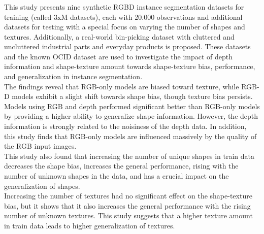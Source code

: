\subsubsection*{\hsmatitelen}%

This study presents nine synthetic RGBD instance segmentation datasets for training (called 3xM datasets), each with 20.000 observations and additional datasets for testing with a special focus on varying the number of shapes and textures. Additionally, a real-world bin-picking dataset with cluttered and uncluttered industrial parts and everyday products is proposed. These datasets and the known OCID dataset are used to investigate the impact of depth information and shape-texture amount towards shape-texture bias, performance, and generalization in instance segmentation.\\
The findings reveal that RGB-only models are biased toward texture, while RGB-D models exhibit a slight shift towards shape bias, though texture bias persists. Models using RGB and depth performed significant better than RGB-only models by providing a higher ability to generalize shape information.  However, the depth information is strongly related to the noisiness of the depth data. In addition, this study finds that RGB-only models are influenced massively by the quality of the RGB input images.\\
This study also found that increasing the number of unique shapes in train data decreases the shape bias, increases the general performance, rising with the number of unknown shapes in the data, and has a crucial impact on the generalization of shapes. \\
Increasing the number of textures had no significant effect on the shape-texture bias, but it shows that it also increases the general performance with the rising number of unknown textures. This study suggests that a higher texture amount in train data leads to higher generalization of textures.




